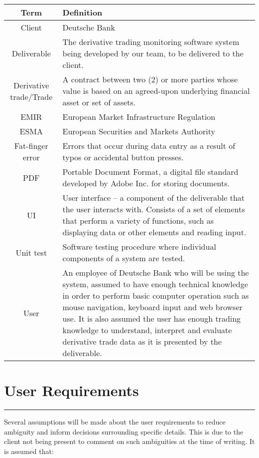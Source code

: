 \documentclass[8pt]{extarticle}
\begin{document}
\begin{tabularx}{\linewidth}{| c | X |}
\hline
\textbf{Term} & \textbf{Definition} \\
\hline
Client & Deutsche Bank \\
\hline
Deliverable & The derivative trading monitoring software system being developed by our team, to be delivered to the client.  \\
\hline
Derivative trade/Trade & A contract between two (2) or more parties whose value is based on an agreed-upon underlying financial asset or set of assets. \\
\hline
EMIR & European Market Infrastructure Regulation \\
\hline
ESMA & European Securities and Markets Authority \\
\hline
Fat-finger error & Errors that occur during data entry as a result of typos or accidental button presses. \\
\hline
PDF & Portable Document Format, a digital file standard developed by Adobe Inc. for storing documents.  \\
\hline
UI & User interface – a component of the deliverable that the user interacts with. Consists of a set of elements that perform a variety of functions, such as displaying data or other elements and reading input. \\
\hline
Unit test & Software testing procedure where individual components of a system are tested. \\
\hline
User & An employee of Deutsche Bank who will be using the system, assumed to have enough technical knowledge in order to perform basic computer operation such as mouse navigation, keyboard input and web browser use. It is also assumed the user has enough trading knowledge to understand, interpret and evaluate derivative trade data as it is presented by the deliverable. \\
\hline
\end{tabularx}

\section*{User Requirements}
\hrule
\vspace{9pt}

Several assumptions will be made about the user requirements to reduce ambiguity and inform decisions surrounding specific details. This is due to the client not being present to comment on such ambiguities at the time of writing. It is assumed that: 
\end{document}
